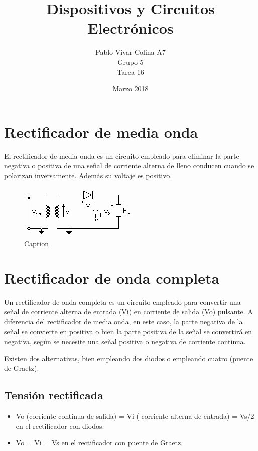 \documentclass{article}
\title{Dispositivos y Circuitos Electrónicos}
\author{Pablo Vivar Colina A7\\
Grupo 5\\
Tarea 16
}
\date{Marzo 2018}
\begin{document}
\maketitle

\section{Rectificador de media onda}

El rectificador de media onda es un circuito empleado para eliminar la parte negativa o positiva de una señal de corriente alterna de lleno conducen cuando se polarizan inversamente. Además su voltaje es positivo.\citep{circuitoMediaOnda}

\begin{figure}[h!]
    \centering
    \includegraphics{Circuito_rectificador_media_onda.png}
    \caption{Caption}
    \label{fig:rectificadorMedia}
\end{figure}

\section{Rectificador de onda completa}

Un rectificador de onda completa es un circuito empleado para convertir una señal de corriente alterna de entrada (Vi) en corriente de salida (Vo) pulsante. A diferencia del rectificador de media onda, en este caso, la parte negativa de la señal se convierte en positiva o bien la parte positiva de la señal se convertirá en negativa, según se necesite una señal positiva o negativa de corriente continua.

Existen dos alternativas, bien empleando dos diodos o empleando cuatro (puente de Graetz).\citep{circuitoOnda}

\subsection{Tensión rectificada}

\begin{itemize}
    \item  Vo (corriente continua de salida) = Vi ( corriente alterna de entrada) = Vs/2 en el rectificador con diodos.
    \item  Vo = Vi = Vs en el rectificador con puente de Graetz.
\end{itemize}
\end{document}
